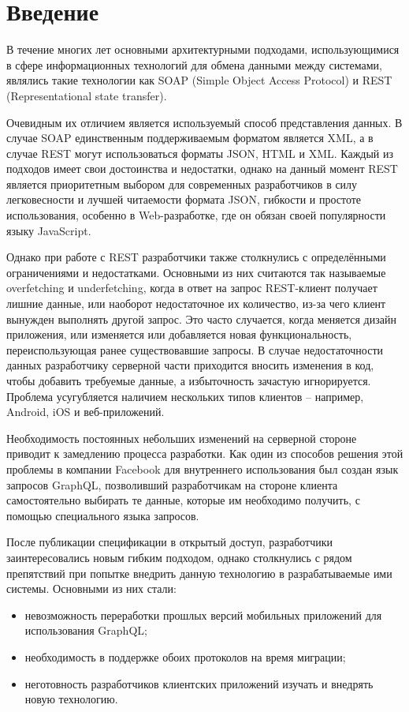 \chapter*{Введение} %

В течение многих лет основными архитектурными подходами, использующимися в сфере информационных технологий для обмена данными между системами, являлись такие технологии как SOAP (Simple Object Access Protocol) и REST (Representational state transfer).

Очевидным их отличием является используемый способ представления данных.
В случае SOAP единственным поддерживаемым форматом является XML, а в случае REST могут использоваться форматы JSON, HTML и XML. Каждый из подходов имеет свои достоинства и недостатки, однако на данный момент REST является приоритетным выбором для современных разработчиков в силу легковесности и лучшей читаемости формата JSON, гибкости и простоте использования, особенно в Web-разработке, где он обязан своей популярности языку JavaScript.

Однако при работе с REST разработчики также столкнулись с определёнными ограничениями и недостатками.
Основными из них считаются так называемые overfetching и underfetching, когда в ответ на запрос REST-клиент получает лишние данные, или наоборот недостаточное их количество, из-за чего клиент вынужден выполнять другой запрос.
Это часто случается, когда меняется дизайн приложения, или изменяется или добавляется новая функциональность, переиспользующая ранее существовавшие запросы.
В случае недостаточности данных разработчику серверной части приходится вносить изменения в код, чтобы добавить требуемые данные, а избыточность зачастую игнорируется.
Проблема усугубляется наличием нескольких типов клиентов – например, Android, iOS и веб-приложений.

Необходимость постоянных небольших изменений на серверной стороне приводит к замедлению процесса разработки.
Как один из способов решения этой проблемы в компании Facebook для внутреннего использования был создан язык запросов GraphQL, позволивший разработчикам на стороне клиента самостоятельно выбирать те данные, которые им необходимо получить, с помощью специального языка запросов.

После публикации спецификации в открытый доступ, разработчики заинтересовались новым гибким подходом, однако столкнулись с рядом препятствий при попытке внедрить данную технологию в разрабатываемые ими системы.
Основными из них стали:
\begin{itemize}
    \item невозможность переработки прошлых версий мобильных приложений для использования GraphQL;
	\item необходимость в поддержке обоих протоколов на время миграции;
	\item неготовность разработчиков клиентских приложений изучать и внедрять новую технологию.
\end{itemize}

